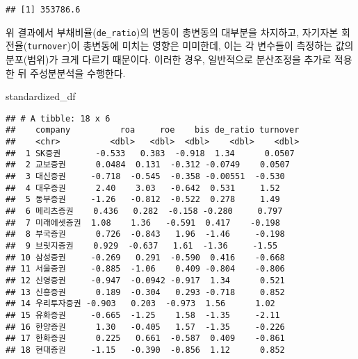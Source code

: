 \documentclass[]{book}
\newenvironment{Shaded}{\begin{snugshade}}{\end{snugshade}}
\newcommand{\CommentTok}[1]{\textcolor[rgb]{0.56,0.35,0.01}{\textit{#1}}}
\newcommand{\ControlFlowTok}[1]{\textcolor[rgb]{0.13,0.29,0.53}{\textbf{#1}}}
\newcommand{\KeywordTok}[1]{\textcolor[rgb]{0.13,0.29,0.53}{\textbf{#1}}}
\newcommand{\NormalTok}[1]{#1}
\newcommand{\OperatorTok}[1]{\textcolor[rgb]{0.81,0.36,0.00}{\textbf{#1}}}
\newcommand{\StringTok}[1]{\textcolor[rgb]{0.31,0.60,0.02}{#1}}
\begin{document}
\begin{verbatim}
## [1] 353786.6
\end{verbatim}

위 결과에서 부채비율(\texttt{de\_ratio})의 변동이 총변동의 대부분을 차지하고, 자기자본 회전율(\texttt{turnover})이 총변동에 미치는 영향은 미미한데, 이는 각 변수들이 측정하는 값의 분포(범위)가 크게 다르기 때문이다. 이러한 경우, 일반적으로 분산조정을 추가로 적용한 뒤 주성분분석을 수행한다.

\begin{Shaded}
\end{Shaded}

\begin{Shaded}
\begin{Highlighting}[]
\NormalTok{standardized_df}
\end{Highlighting}
\end{Shaded}

\begin{verbatim}
## # A tibble: 18 x 6
##    company          roa     roe    bis de_ratio turnover
##    <chr>          <dbl>   <dbl>  <dbl>    <dbl>    <dbl>
##  1 SK증권       -0.533   0.383  -0.918  1.34      0.0507
##  2 교보증권      0.0484  0.131  -0.312 -0.0749    0.0507
##  3 대신증권     -0.718  -0.545  -0.358 -0.00551  -0.530 
##  4 대우증권      2.40    3.03   -0.642  0.531     1.52  
##  5 동부증권     -1.26   -0.812  -0.522  0.278     1.49  
##  6 메리츠증권    0.436   0.282  -0.158 -0.280     0.797 
##  7 미래에셋증권  1.08    1.36   -0.591  0.417    -0.198 
##  8 부국증권      0.726  -0.843   1.96  -1.46     -0.198 
##  9 브릿지증권    0.929  -0.637   1.61  -1.36     -1.55  
## 10 삼성증권     -0.269   0.291  -0.590  0.416    -0.668 
## 11 서울증권     -0.885  -1.06    0.409 -0.804    -0.806 
## 12 신영증권     -0.947  -0.0942 -0.917  1.34      0.521 
## 13 신흥증권      0.189  -0.304   0.293 -0.718     0.852 
## 14 우리투자증권 -0.903   0.203  -0.973  1.56      1.02  
## 15 유화증권     -0.665  -1.25    1.58  -1.35     -2.11  
## 16 한양증권      1.30   -0.405   1.57  -1.35     -0.226 
## 17 한화증권      0.225   0.661  -0.587  0.409    -0.861 
## 18 현대증권     -1.15   -0.390  -0.856  1.12      0.852
\end{verbatim}
\end{document}
